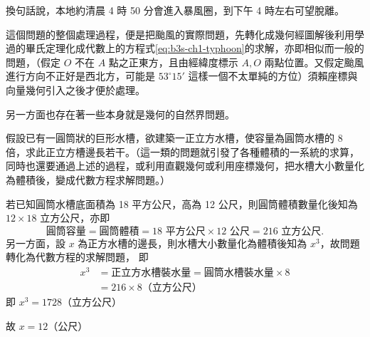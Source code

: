 換句話說，本地約清晨 4 時 50 分會進入暴風圈，到下午 4 時左右可望脫離。

這個問題的整個處理過程，便是把颱風的實際問題，先轉化成幾何經圖解後利用學過的畢氏定理化成代數上的方程式\eqref{eq:b3s-ch1-typhoon}的求解，亦即相似而一般的問題，（假定 $O$ 不在 $A$ 點之正東方，且由經緯度標示 $A, O$ 兩點位置。又假定颱風進行方向不正好是西北方，可能是 $53^\circ 15'$ 這樣一個不太單純的方位）須賴座標與向量幾何引入之後才便於處理。\hfill \raisebox{-0.5ex}{\#}

\label{note:b3s-ch1-p7-flowchart-sqrt2}%
\begin{center}
\end{center}

另一方面也存在著一些本身就是幾何的自然界問題。

\begin{example}
假設已有一圓筒狀的巨形水槽，欲建築一正立方水槽，使容量為圓筒水槽的 8 倍，求此正立方槽邊長若干。（這一類的問題就引發了各種體積的一系統的求算，同時也還要通過上述的過程，或利用直觀幾何或利用座標幾何，把水槽大小數量化為體積後，變成代數方程求解問題。）

若已知圓筒水槽底面積為 18 平方公尺，高為 12 公尺，則圓筒體積數量化後知為 $12 \times 18$ 立方公尺，亦即
\[ \text{圓筒容量} = \text{圓筒體積} = 18\text{ 平方公尺} \times 12\text{ 公尺} = 216\text{ 立方公尺}. \]
另一方面，設 $x$ 為正方水槽的邊長，則水槽大小數量化為體積後知為 $x^3$，故問題轉化為代數方程的求解問題，
即
\begin{align*}
x^3 &= \text{正立方水槽裝水量} = \text{圓筒水槽裝水量} \times 8 \\
    &= 216 \times 8 \text{（立方公尺）}
\end{align*}
即 $x^3 = 1728$（立方公尺）

故 $x = 12$（公尺）
\end{example}

